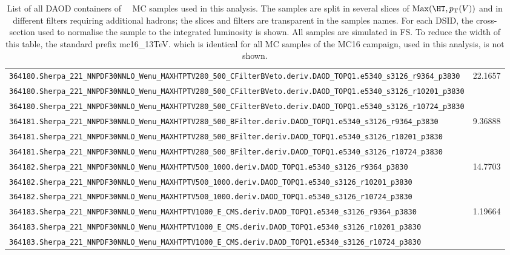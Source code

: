 \begin{table}[htbp]
{\begin{tabular}{l|r}
\verb|364180.Sherpa_221_NNPDF30NNLO_Wenu_MAXHTPTV280_500_CFilterBVeto.deriv.DAOD_TOPQ1.e5340_s3126_r9364_p3830|  & \multirow{3}{*}{22.1657} \\
\verb|364180.Sherpa_221_NNPDF30NNLO_Wenu_MAXHTPTV280_500_CFilterBVeto.deriv.DAOD_TOPQ1.e5340_s3126_r10201_p3830| & \\
\verb|364180.Sherpa_221_NNPDF30NNLO_Wenu_MAXHTPTV280_500_CFilterBVeto.deriv.DAOD_TOPQ1.e5340_s3126_r10724_p3830| & \\ \hline

\verb|364181.Sherpa_221_NNPDF30NNLO_Wenu_MAXHTPTV280_500_BFilter.deriv.DAOD_TOPQ1.e5340_s3126_r9364_p3830|       & \multirow{3}{*}{9.36888} \\
\verb|364181.Sherpa_221_NNPDF30NNLO_Wenu_MAXHTPTV280_500_BFilter.deriv.DAOD_TOPQ1.e5340_s3126_r10201_p3830|      & \\
\verb|364181.Sherpa_221_NNPDF30NNLO_Wenu_MAXHTPTV280_500_BFilter.deriv.DAOD_TOPQ1.e5340_s3126_r10724_p3830|      & \\ \hline

\verb|364182.Sherpa_221_NNPDF30NNLO_Wenu_MAXHTPTV500_1000.deriv.DAOD_TOPQ1.e5340_s3126_r9364_p3830|              & \multirow{3}{*}{14.7703} \\
\verb|364182.Sherpa_221_NNPDF30NNLO_Wenu_MAXHTPTV500_1000.deriv.DAOD_TOPQ1.e5340_s3126_r10201_p3830|             & \\
\verb|364182.Sherpa_221_NNPDF30NNLO_Wenu_MAXHTPTV500_1000.deriv.DAOD_TOPQ1.e5340_s3126_r10724_p3830|             & \\ \hline

\verb|364183.Sherpa_221_NNPDF30NNLO_Wenu_MAXHTPTV1000_E_CMS.deriv.DAOD_TOPQ1.e5340_s3126_r9364_p3830|            & \multirow{3}{*}{1.19664} \\
\verb|364183.Sherpa_221_NNPDF30NNLO_Wenu_MAXHTPTV1000_E_CMS.deriv.DAOD_TOPQ1.e5340_s3126_r10201_p3830|           & \\
\verb|364183.Sherpa_221_NNPDF30NNLO_Wenu_MAXHTPTV1000_E_CMS.deriv.DAOD_TOPQ1.e5340_s3126_r10724_p3830|           & \\ \hline

\bottomrule
\end{tabular}}
  \caption{
    List of all DAOD containers of \Wenu\ \sherpa\ MC samples used in this analysis.
    The samples are split in several slices of $\mathrm{Max}(\HT,\pT(V))$ and in different filters requiring additional hadrons;
    the slices and filters are transparent in the samples names.
    For each DSID, the cross-section used to normalise the sample to the integrated luminosity is shown.
    All samples are simulated in FS.
    To reduce the width of this table, the standard prefix \textsf{mc16\_13TeV.} which is identical for all MC samples of the MC16 campaign, used in this analysis, is not shown.
  }
  \label{tab:MC_samples_Wenu}
\end{table}



